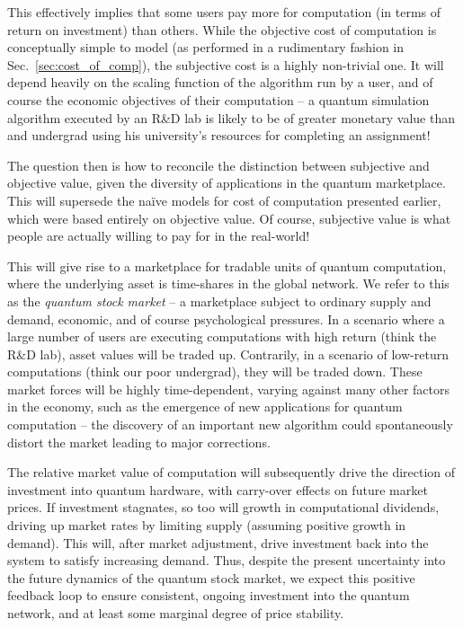 This effectively implies that some users pay more for computation (in terms of return on investment) than others. While the objective cost of computation is conceptually simple to model (as performed in a rudimentary fashion in Sec.~\ref{sec:cost_of_comp}), the subjective cost is a highly non-trivial one. It will depend heavily on the scaling function of the algorithm run by a user, and of course the economic objectives of their computation -- a quantum simulation algorithm executed by an R\&D lab is likely to be of greater monetary value than and undergrad using his university's resources for completing an assignment!

The question then is how to reconcile the distinction between subjective and objective value, given the diversity of applications in the quantum marketplace. This will supersede the na\"ive models for cost of computation presented earlier, which were based entirely on objective value. Of course, subjective value is what people are actually willing to pay for in the real-world!

This will give rise to a marketplace for tradable units of quantum computation, where the underlying asset is time-shares in the global network. We refer to this as the \textit{quantum stock market} -- a marketplace subject to ordinary supply and demand, economic, and of course psychological pressures. In a scenario where a large number of users are executing computations with high return (think the R\&D lab), asset values will be traded up. Contrarily, in a scenario of low-return computations (think our poor undergrad), they will be traded down. These market forces will be highly time-dependent, varying against many other factors in the economy, such as the emergence of new applications for quantum computation -- the discovery of an important new algorithm could spontaneously distort the market leading to major corrections.

The relative market value of computation will subsequently drive the direction of investment into quantum hardware, with carry-over effects on future market prices. If investment stagnates, so too will growth in computational dividends, driving up market rates by limiting supply (assuming positive growth in demand). This will, after market adjustment, drive investment back into the system to satisfy increasing demand. Thus, despite the present uncertainty into the future dynamics of the quantum stock market, we expect this positive feedback loop to ensure consistent, ongoing investment into the quantum network, and at least some marginal degree of price stability.

